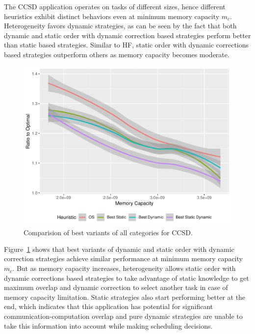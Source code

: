 \documentclass[sigconf]{acmart}
\begin{document}
{		The CCSD application operates on tasks of different sizes, hence different heuristics exhibit distinct behaviors even at minimum memory capacity $m_c$. Heterogeneity favors dynamic strategies, as can be seen by the fact that both dynamic and static order with dynamic correction based strategies perform better than static based strategies. Similar to HF, static order with dynamic corrections based strategies outperform others as memory capacity becomes moderate. 
		
		
		\begin{figure}[htb]
			\includegraphics[scale=0.5]{./results/plots/ratio_to_optimal_ccsd-best.pdf}
			\caption{Comparision of best variants of all categories for CCSD.}
			\label{fig:ratio_to_optimal_best_ccsd}
		\end{figure}
		
		Figure~\ref{fig:ratio_to_optimal_best_ccsd} shows that best variants of dynamic and static order with dynamic correction strategies achieve similar performance at minimum memory capacity $m_c$. But as memory capacity increases, heterogeneity allows static order with dynamic corrections based strategies to take advantage of static knowledge to get maximum overlap and dynamic correction to select another task in case of memory capacity limitation. Static strategies also start performing better at the end, which indicates that this application has potential for significant communication-computation overlap and pure dynamic strategies are unable to take this information into account while making scheduling decisions.
		
}
\end{document}
